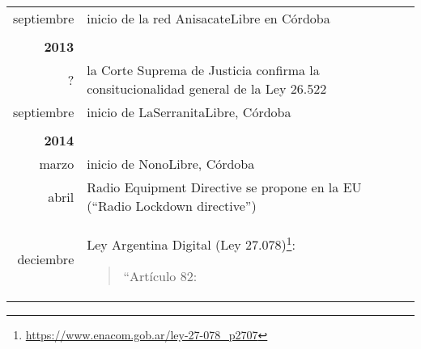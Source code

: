 \begin{longtable}{ r | p{}}
  septiembre & inicio de la red AnisacateLibre en Córdoba \\
  & \\
 \textbf{2013} & \\
 ? & la Corte Suprema de Justicia confirma la consitucionalidad general de la Ley 26.522 \\
septiembre & inicio de LaSerranitaLibre, Córdoba \\
 & \\
 \textbf{2014} & \\
marzo & inicio de NonoLibre, Córdoba \\
abril & Radio Equipment Directive se propone en la EU (``Radio Lockdown directive'') \\
deciembre & Ley Argentina Digital (Ley 27.078)\footnote{\url{https://www.enacom.gob.ar/ley-27-078_p2707}}:
\begin{quotation}
``Artículo 82:


\end{quotation}
\end{longtable}
